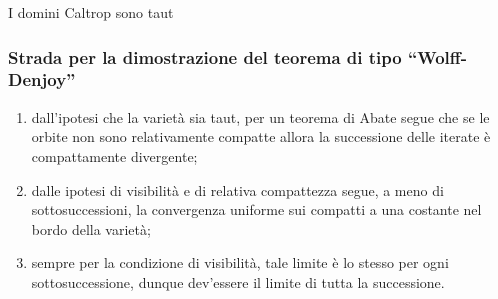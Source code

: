 \begin{frame}{I domini Caltrop sono taut}
\end{frame}

\begin{frame}
  \frametitle{Strada per la dimostrazione del teorema di tipo ``Wolff-Denjoy''}
  \begin{enumerate}
    \item dall'ipotesi che la varietà sia taut, per un teorema di Abate segue che se le orbite non sono relativamente compatte allora la successione delle iterate è compattamente divergente;\pause
    \item dalle ipotesi di visibilità e di relativa compattezza segue, a meno di sottosuccessioni, la convergenza uniforme sui compatti a una costante nel bordo della varietà;\pause
    \item sempre per la condizione di visibilità, tale limite è lo stesso per ogni sottosuccessione, dunque dev'essere il limite di tutta la successione.
  \end{enumerate}
\end{frame}